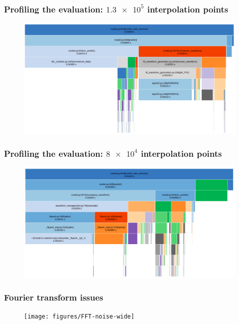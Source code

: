 \documentclass{beamer}
\begin{document}
\begin{frame}
    \frametitle{Profiling the evaluation: \(\num{1.3e5}\) interpolation points}
    \begin{figure}[ht]
    \centering
    \includegraphics[width=\textwidth]{figures/profile_12Hz_16downsampling}
    \label{fig:profile_12Hz_16downsampling}
    \end{figure}
\end{frame}

\begin{frame}
    \frametitle{Profiling the evaluation: \(\num{8e4}\) interpolation points}
    \begin{figure}[ht]
    \centering
    \includegraphics[width=\textwidth]{figures/profile_12Hz_256downsampling}
    \label{fig:profile_12Hz_256downsampling}
    \end{figure}
\end{frame}

\begin{frame}
    \frametitle{Fourier transform issues}
    
    \begin{figure}[ht]
    \centering
    \texttt{[image: figures/FFT-noise-wide]}
    \label{fig:fft-noise-wide}
    \end{figure}
\end{frame}
\end{document}
